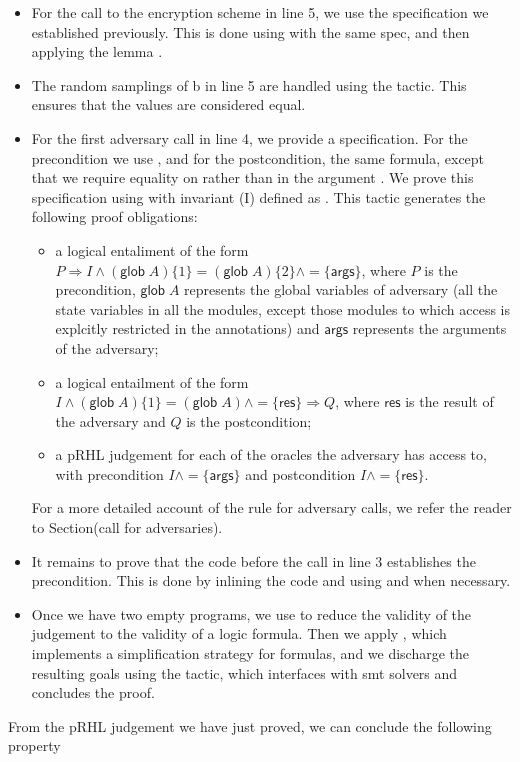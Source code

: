 \begin{itemize}
\item For the call to the encryption scheme in line 5, we use the
  specification we established previously. This is done using
   with the same spec, and then applying the lemma
  .

\item The random samplings of b in line 5 are handled using the
   tactic. This ensures that the values are considered equal. 

\item For the first adversary call in line 4, we provide a
  specification. For the precondition we use
 , and for the postcondition, the same formula, except that
 we require equality on  rather than in the argument
 . We prove this specification using  with invariant
 (I) defined as . This
 tactic generates the following proof obligations:
\begin{itemize}
\item a logical entaliment of the form $P \Rightarrow I \land
  (\mathsf{glob}\;A)\{1\} = (\mathsf{glob}\;A)\{2\} \land
  =\{\mathsf{args}\}$, where $P$ is the precondition,
  $\mathsf{glob}\;A$ represents the global variables of adversary
   (all the state variables in all the modules, except those
  modules to which access is explcitly restricted in the annotations)
  and $\mathsf{args}$ represents the arguments of the adversary;
\item a logical entailment of the form $I \land
  (\mathsf{glob}\;A)\{1\} = (\mathsf{glob}\;A) \land =\{\mathsf{res}\}
  \Rightarrow Q$, where $\mathsf{res}$ is the result of the adversary
  and $Q$ is the postcondition;
\item a pRHL judgement for each of the oracles the adversary has
  access to, with precondition $I \land =\{\mathsf{args}\}$ and
  postcondition $I \land =\{\mathsf{res}\}$.
 \end{itemize} 
For a more detailed account of the rule for adversary calls, we refer
the reader to Section(call for adversaries).
\item It remains to prove that the code before the call in line 3
  establishes the precondition. This is done by inlining the code and
  using  and  when necessary. 

\item Once we have two empty programs, we use  to reduce the
  validity of the judgement to the validity of a logic formula. Then
  we apply , which implements a simplification strategy
  for formulas, and we discharge the resulting goals using the
   tactic, which interfaces with smt solvers and concludes the
  proof. 
\end{itemize}
From the pRHL judgement we have just proved, we can conclude the
following property

